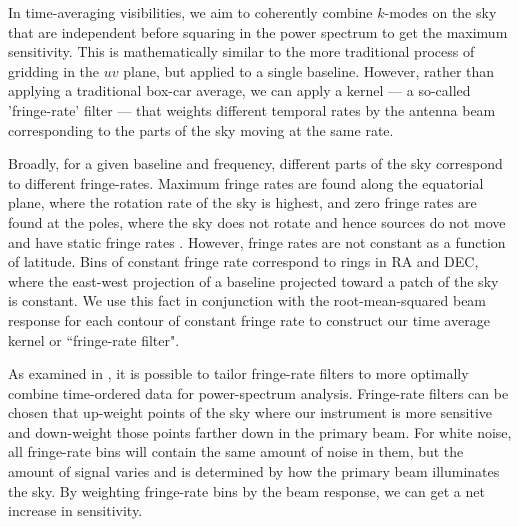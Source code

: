\documentclass[twocolumn,numberedappendix]{emulateapj} \shorttitle{New Limits on the 21 cm Power Spectrum at $z=8.4$}
\begin{document}
In time-averaging visibilities,
we aim
to coherently combine  $k$-modes on the sky that are independent  before squaring in the power spectrum to get the maximum
sensitivity. This is mathematically similar to the more traditional process of
gridding in the $uv$ plane, but applied to a single baseline.  
However, rather
than applying a traditional box-car average, we can apply a kernel --- a so-called
'fringe-rate' filter --- that weights different temporal rates by the antenna
beam corresponding to the parts of the sky moving at the same rate.

Broadly, for a given baseline and frequency, different parts of the sky
correspond to different fringe-rates.  Maximum fringe rates are found along the
equatorial plane, where the rotation rate of the sky is highest, and zero
fringe rates are found at the poles, where the sky does not rotate and hence
sources do not move and have static fringe rates \citep{parsons_backer2009}.
However, fringe rates are not constant as a function of latitude. Bins of
constant fringe rate correspond to rings in RA and DEC, where
the east-west projection of a baseline projected toward a patch of the sky is
constant.  We use this fact in conjunction with the root-mean-squared beam response for each
contour of constant fringe rate to construct our time average kernel or
``fringe-rate filter".


%

As examined in \citet{parsons_et_al2015}, it is possible to tailor fringe-rate filters
to more optimally combine time-ordered data for power-spectrum analysis.
Fringe-rate filters can be chosen that
up-weight points of the sky where our instrument is more sensitive and down-weight
those points farther down in the primary beam. 
For white noise,
all fringe-rate bins will contain the same amount of noise in them, but the amount of signal
varies and is determined by how the primary beam illuminates the sky.
By weighting fringe-rate
bins by the beam response, we can get a net increase in sensitivity.  
\end{document}
